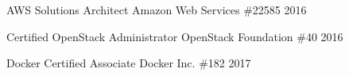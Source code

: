 

\begin{cvhonors}

  \cvhonor
    {AWS Solutions Architect}
    {Amazon Web Services}
    {\#22585}
    {2016} %

  \cvhonor
    {Certified OpenStack Administrator}
    {OpenStack Foundation}
    {\#40}
    {2016} %

  \cvhonor
    {Docker Certified Associate}
    {Docker Inc.}
    {\#182}
    {2017} %

\end{cvhonors}
